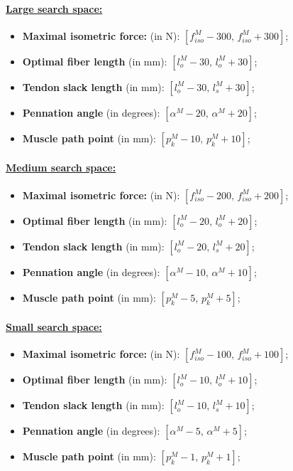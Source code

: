 \paragraph*{\underline{Large search space:}}
\begin{itemize}[noitemsep]
    \item {\textbf{Maximal isometric force:} (in N): $[f_{iso}^M - 300,\, f_{iso}^M + 300]$;}
    \item {\textbf{Optimal fiber length} (in mm): $[l_o^M - 30,\, l_o^M + 30]$;}
    \item {\textbf{Tendon slack length} (in mm): $[l_o^M - 30,\, l_s^M + 30]$;}
    \item {\textbf{Pennation angle} (in degrees): $[\alpha^M - 20,\, \alpha^M + 20]$;}
    \item {\textbf{Muscle path point} (in mm): $[p_k^M - 10,\, p_k^M + 10]$;}
\end{itemize}

\paragraph*{\underline{Medium search space:}}
\begin{itemize}[noitemsep]
    \item {\textbf{Maximal isometric force:} (in N): $[f_{iso}^M - 200,\, f_{iso}^M + 200]$;}
    \item {\textbf{Optimal fiber length} (in mm): $[l_o^M - 20,\, l_o^M + 20]$;}
    \item {\textbf{Tendon slack length} (in mm): $[l_o^M - 20,\, l_s^M + 20]$;}
    \item {\textbf{Pennation angle} (in degrees): $[\alpha^M - 10,\, \alpha^M + 10]$;}
    \item {\textbf{Muscle path point} (in mm): $[p_k^M - 5,\, p_k^M + 5]$;}
\end{itemize}

\paragraph*{\underline{Small search space:}}
\begin{itemize}[noitemsep]
    \item {\textbf{Maximal isometric force:} (in N): $[f_{iso}^M - 100,\, f_{iso}^M + 100]$;}
    \item {\textbf{Optimal fiber length} (in mm): $[l_o^M - 10,\, l_o^M + 10]$;}
    \item {\textbf{Tendon slack length} (in mm): $[l_o^M - 10,\, l_s^M + 10]$;}
    \item {\textbf{Pennation angle} (in degrees): $[\alpha^M - 5,\, \alpha^M + 5]$;}
    \item {\textbf{Muscle path point} (in mm): $[p_k^M - 1,\, p_k^M + 1]$;}
\end{itemize}

